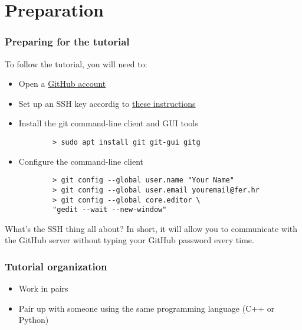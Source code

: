 \section{Preparation}

\begin{frame}[fragile]
	\frametitle{Preparing for the tutorial}
	
	To follow the tutorial, you will need to:
	\begin{itemize}
		\item  Open a \href{https://github.com/join?source=header-home}{GitHub account}
		\item Set up an SSH key accordig to \href{https://help.github.com/articles/adding-a-new-ssh-key-to-your-github-account/}{these instructions}
		\item Install the git command-line client and GUI tools
		\begin{verbatim}
		> sudo apt install git git-gui gitg
		\end{verbatim}
		\item Configure the command-line client
		\begin{verbatim}
		> git config --global user.name "Your Name"
		> git config --global user.email youremail@fer.hr
		> git config --global core.editor \
		"gedit --wait --new-window"
		\end{verbatim}
	\end{itemize}
	
	\begin{block}{What's the SSH thing all about?}
	In short, it will allow you to communicate with the GitHub server without typing your GitHub password every time.
	\end{block}
\end{frame}


\begin{frame}
	\frametitle{Tutorial organization}
	
	\begin{itemize}
		\item Work in pairs
		\item Pair up with someone using the same programming language (C++ or Python)
	\end{itemize}
	
\end{frame}

